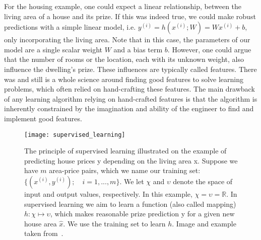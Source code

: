 For the housing example, one could expect a linear relationship, between the living area of a house and its prize. If this was indeed true, we could make robust predictions with a simple linear model, i.e. $y^{(i)} = h(x^{(i)}; W) = Wx^{(i)} + b$, only incorporating the living area. Note that in this case, the parameters of our model are a single scalar weight $W$ and a bias term $b$.
However, one could argue that the number of rooms or the location, each with its unknown weight, also influence the dwelling's prize. These influences are typically called features. There was and still is a whole science around finding good features to solve learning problems, which often relied on hand-crafting these features. The main drawback of any learning algorithm relying on hand-crafted features is that the algorithm is inherently constrained by the imagination and ability of the engineer to find and implement good features.

\begin{figure}[htbp]
    \centering
	\texttt{[image: supervised\_learning]}
    \caption[Supervised Learning]{The principle of supervised learning illustrated on the example of predicting house prices y depending on the living area x. Suppose we have $m$ area-price pairs, which we name our training set: $\{(x^{(i)}, y^{(i)}); \quad i = 1,...,m\}$. We let $\chi$ and $\upsilon$ denote the space of input and output values, respectively. In this example, $\chi = \upsilon = \mathbb{R}$. In supervised learning we aim to learn a function (also called mapping) $h : \chi \mapsto \upsilon$, which makes reasonable prize prediction y for a given new house area $\hat{x}$. We use the training set to learn $h$. Image and example taken from~\cite{Ng2012StanfordNotes}.}
    \label{fig:dl_supervised}
\end{figure}

